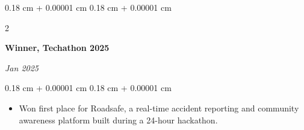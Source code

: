 \documentclass[10pt, letterpaper]{article}
\newenvironment{highlights}{
    \begin{itemize}[
        topsep=0.09 cm,
        parsep=0.09 cm,
        partopsep=0pt,
        itemsep=0pt,
        leftmargin=0.4 cm + 10pt
    ]
}{
    \end{itemize}
} %
\newenvironment{onecolentry}{
    \begin{adjustwidth}{
        0.18 cm + 0.00001 cm
    }{
        0.18 cm + 0.00001 cm
    }
}{
    \end{adjustwidth}
} %
\newenvironment{twocolentry}[2][]{
    \onecolentry
    \def\secondColumn{#2}
    \setcolumnwidth{\fill, 4.5 cm}
    \begin{paracol}{2}
}{
    \switchcolumn \raggedleft \secondColumn
    \end{paracol}
    \endonecolentry
} %
\begin{document}
\vspace{0.05 cm}

\begin{twocolentry}{
\textit{Jan 2025}}
\textbf{Winner, Techathon 2025}
\end{twocolentry}

\vspace{0.02 cm}
\begin{onecolentry}
    \begin{highlights}
        \item Won first place for Roadsafe, a real-time accident reporting and community awareness platform built during a 24-hour hackathon.
    \end{highlights}
\end{onecolentry}
\end{document}
